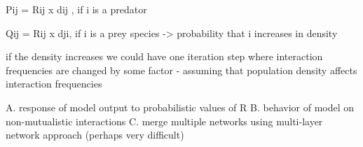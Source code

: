 \documentclass[12pt]{article}
\begin{document}
Pij = Rij x dij , if i is a predator

Qij = Rij x dji, if i is a prey species -> probability that i increases in density

if the density increases we could have one iteration step where interaction frequencies are changed by some factor - assuming that population density affects interaction frequencies



A. response of model output to probabilistic values of R
B. behavior of model on non-mutualistic interactions
C. merge multiple networks using multi-layer network approach (perhaps very difficult)
\end{document}
